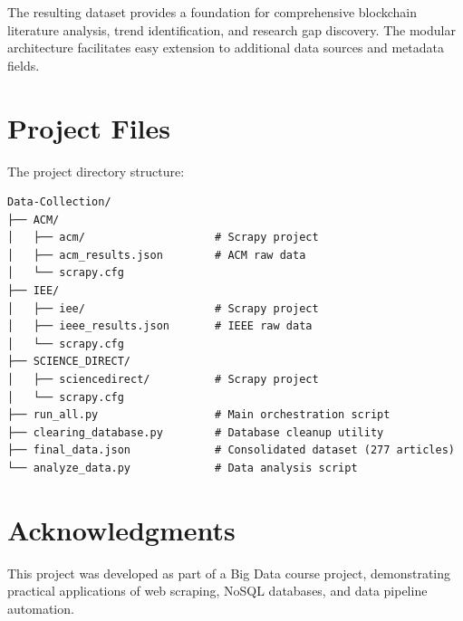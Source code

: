 \documentclass[12pt,a4paper]{article}
\begin{document}
The resulting dataset provides a foundation for comprehensive blockchain literature analysis, trend identification, and research gap discovery. The modular architecture facilitates easy extension to additional data sources and metadata fields.

\section{Project Files}

The project directory structure:

\begin{verbatim}
Data-Collection/
├── ACM/
│   ├── acm/                    # Scrapy project
│   ├── acm_results.json        # ACM raw data
│   └── scrapy.cfg
├── IEE/
│   ├── iee/                    # Scrapy project
│   ├── ieee_results.json       # IEEE raw data
│   └── scrapy.cfg
├── SCIENCE_DIRECT/
│   ├── sciencedirect/          # Scrapy project
│   └── scrapy.cfg
├── run_all.py                  # Main orchestration script
├── clearing_database.py        # Database cleanup utility
├── final_data.json             # Consolidated dataset (277 articles)
└── analyze_data.py             # Data analysis script
\end{verbatim}

\section*{Acknowledgments}

This project was developed as part of a Big Data course project, demonstrating practical applications of web scraping, NoSQL databases, and data pipeline automation.
\end{document}

